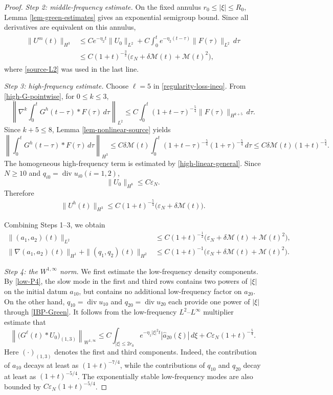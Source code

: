 \documentclass[10pt,a4paper]{amsart}
\begin{document}
\begin{proof}
\medskip
\noindent\emph{Step 2: middle-frequency estimate.}
On the fixed annulus $r_0\le|\xi|\le R_0$, Lemma \ref{lem-green-estimates} gives an exponential semigroup bound.  Since all derivatives are equivalent on this annulus,
\begin{align}\label{middle-nonlinear}
\begin{aligned}
\|U^m(t)\|_{H^3} &\le Ce^{-\eta_2   t}\|U_0\|_{L^2} +C\int_0^te^{-\eta_2  (t-\tau)}\|F(\tau)\|_{L^2}\,d\tau \\
&\le C(1+t)^{-\frac{3}{2}} \big(\varepsilon_N+\delta\mathcal M(t)+\mathcal M(t)^2\big),
\end{aligned}
\end{align}
where \eqref{source-L2} was used in the last line.

\medskip
\noindent\emph{Step 3: high-frequency estimate.} Choose $\ell=5$ in \eqref{regularity-loss-ineq}.  From \eqref{high-G-pointwise}, for $0\le k\le3$,
\[ 
\left\|\nabla^k\int_0^tG^h(t-\tau)*F(\tau)\,d\tau\right\|_{L^2}
\le C\int_0^t(1+t-\tau)^{-\frac{5}{4}}\|F(\tau)\|_{H^{k+5}}\,d\tau.
\] 
Since $k+5\le8$, Lemma \ref{lem-nonlinear-source} yields
\[
\left\|\int_0^tG^h(t-\tau)*F(\tau)\,d\tau\right\|_{H^3} \le C\delta\mathcal M(t) \int_0^t(1+t-\tau)^{-\frac{5}{4}}(1+\tau)^{-\frac{5}{4}}\,d\tau \le C\delta\mathcal M(t)(1+t)^{-\frac{5}{4}}.
\]
The homogeneous high-frequency term is estimated by \eqref{high-linear-general}.  Since {$N\geq 10$} and $q_{i0}=\operatorname{div}u_{i0} (i=1,2)$,
\[
\|U_0\|_{H^8}\le C\varepsilon_N.
\]
Therefore
\begin{align}\label{high-nonlinear-final}
\|U^h(t)\|_{H^3}
\le C(1+t)^{-\frac{5}{4}}\big(\varepsilon_N+\delta\mathcal M(t)\big).
\end{align}


Combining Steps 1--3, we obtain
\begin{align}
\|(a_1,a_2)(t)\|_{L^2}
&\le C(1+t)^{-\frac12}\big(\varepsilon_N+\delta\mathcal M(t)+\mathcal M(t)^2\big),\label{T01}\\
\|\nabla(a_1,a_2)(t)\|_{H^1}
+\|(q_1,q_2)(t)\|_{H^2}
&\le C(1+t)^{-1}\big(\varepsilon_N+\delta\mathcal M(t)+\mathcal M(t)^2\big).\label{T02}
\end{align}


\medskip
\noindent\emph{Step 4: the $W^{1,\infty}$ norm.} We first estimate the low-frequency density components. By \eqref{low-P4}, the slow mode in the first and third rows contains two powers of $|\xi|$ on the initial datum $a_{10}$, but contains no additional low-frequency factor on $a_{20}$. On the other hand, $q_{10}=\operatorname{div}u_{10}$ and $q_{20}=\operatorname{div}u_{20}$ each provide one power of $|\xi|$ through \eqref{IBP-Green}. It follows from the low-frequency $L^2$--$L^\infty$ multiplier estimate that
\[
\left\| \bigl(G^\ell(t)*U_0\bigr)_{(1,3)} \right\|_{W^{1,\infty}} \le C\int_{|\xi|\le 2r_0} e^{-\eta_1 |\xi|^2t} |\widehat a_{20}(\xi)|\,d\xi +C\varepsilon_N(1+t)^{-\frac54}.
\]
Here $(\cdot)_{(1,3)}$ denotes the first and third components. Indeed, the contribution of $a_{10}$ decays at least as $(1+t)^{-7/4}$, while the contributions of $q_{10}$ and $q_{20}$ decay at least as $(1+t)^{-5/4}$. The exponentially stable low-frequency modes are also bounded by $C\varepsilon_N(1+t)^{-5/4}$.


\end{proof}
\end{document}

